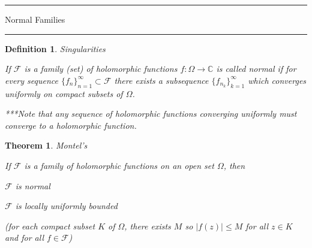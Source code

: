 \documentclass[12pt]{Qual}
\newtheorem{theorem}{Theorem}
\newtheorem{definition}{Definition}
\begin{document}
\newpage










\begin{center}
\noindent\textcolor{blue!60!black}{\rule{15cm}{1mm}}
\Huge \faBug\faPuzzlePiece\faCoffee Normal Families \faCoffee\faPuzzlePiece\faBug
\vspace{-0.5cm}
\noindent\textcolor{blue!60!black}{\rule{15cm}{1mm}}
\end{center}
\vspace{0.5cm}
\begin{definition}{\Large\textit{Singularities}}

If $\mathscr{F}$ is a family (set) of holomorphic functions $f:\Omega\to\mathbb{C}$ is called \textit{normal} if for every sequence $\{f_n\}_{n=1}^\infty\subset\mathscr{F}$ there exists a subsequence $\{f_{n_k}\}_{k=1}^\infty$ which converges uniformly on compact subsets of $\Omega$.

\vspace{0.5cm}

***Note that any sequence of holomorphic functions converging uniformly must converge to a holomorphic function.

\end{definition}
\vspace{0.5cm}
\begin{theorem}{\Large\textit{Montel's}}

If $\mathscr{F}$ is a family of holomorphic functions on an open set $\Omega$, then
\vspace{0.25cm}

\begin{minipage}{0.2\textwidth}
$\mathscr{F}$ is normal
\end{minipage}\hspace{-0.25cm}\boxed{\iff}\hspace{0.5cm}\begin{minipage}{0.6\textwidth}
$\mathscr{F}$ is locally uniformly bounded

(for each compact subset $K$ of $\Omega$, there exists $M$ so $|f(z)|\le M$ for all $z\in K$ and for all $f\in\mathscr{F}$)
\end{minipage}

\end{theorem}
\vspace{0.5cm}
\end{document}
